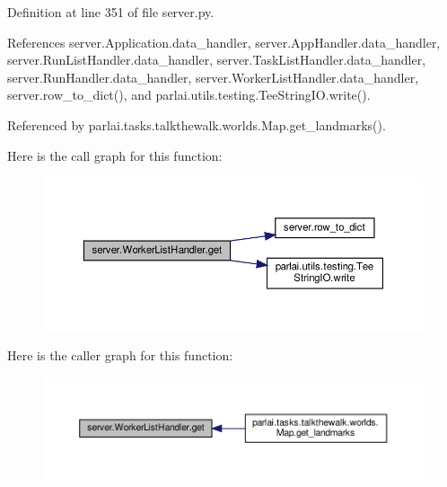 Definition at line 351 of file server.\+py.



References server.\+Application.\+data\+\_\+handler, server.\+App\+Handler.\+data\+\_\+handler, server.\+Run\+List\+Handler.\+data\+\_\+handler, server.\+Task\+List\+Handler.\+data\+\_\+handler, server.\+Run\+Handler.\+data\+\_\+handler, server.\+Worker\+List\+Handler.\+data\+\_\+handler, server.\+row\+\_\+to\+\_\+dict(), and parlai.\+utils.\+testing.\+Tee\+String\+I\+O.\+write().



Referenced by parlai.\+tasks.\+talkthewalk.\+worlds.\+Map.\+get\+\_\+landmarks().

Here is the call graph for this function\+:
\nopagebreak
\begin{figure}[H]
\begin{center}
\leavevmode
\includegraphics[width=350pt]{classserver_1_1WorkerListHandler_a96fc3c606b269d6f70a0c14b08bb4e0b_cgraph}
\end{center}
\end{figure}
Here is the caller graph for this function\+:
\nopagebreak
\begin{figure}[H]
\begin{center}
\leavevmode
\includegraphics[width=350pt]{classserver_1_1WorkerListHandler_a96fc3c606b269d6f70a0c14b08bb4e0b_icgraph}
\end{center}
\end{figure}
\mbox{\label{classserver_1_1WorkerListHandler_a843945560a336050078a4e45bd4f12ba}} 
